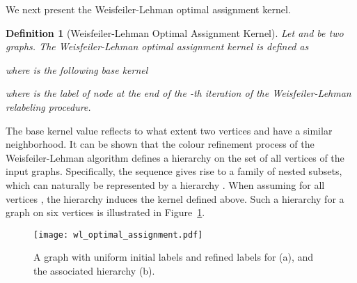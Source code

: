 \documentclass[twoside,11pt]{article}
\newtheorem{definition}{Definition}
\begin{document}
We next present the Weisfeiler-Lehman optimal assignment kernel.
\begin{definition}[Weisfeiler-Lehman Optimal Assignment Kernel]
  Let  and  be two graphs.
  The Weisfeiler-Lehman optimal assignment kernel is defined as
  
  where  is the following base kernel
  
  where  is the label of node  at the end of the -th iteration of the Weisfeiler-Lehman relabeling procedure.
\end{definition}
The base kernel value reflects to what extent two vertices  and  have a similar neighborhood.
It can be shown that the colour refinement process of the Weisfeiler-Lehman algorithm defines a hierarchy on the set of all vertices of the input graphs.
Specifically, the sequence  gives rise to a family of nested subsets, which can naturally be represented by a hierarchy .
When assuming  for all vertices , the hierarchy induces the kernel defined above.
Such a hierarchy for a graph on six vertices is illustrated in Figure~\ref{fig:wl_optimal_assignment}.
\begin{figure}[t]
  \centering
  \texttt{[image: wl\_optimal\_assignment.pdf]}
    \caption{A graph  with uniform initial labels  and refined labels  for  (a), and the associated hierarchy (b).}
    \label{fig:wl_optimal_assignment}
\end{figure}
\end{document}
